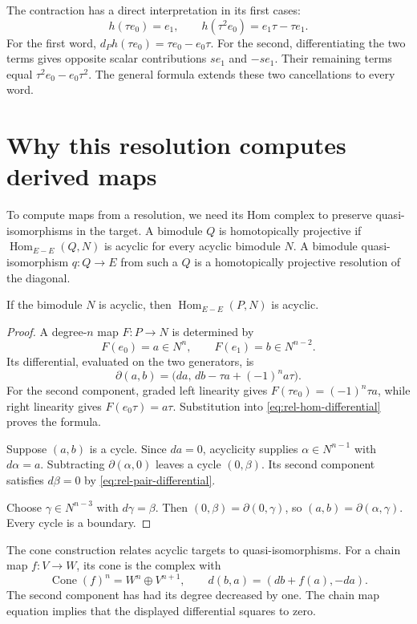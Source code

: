The contraction has a direct interpretation in its first cases:
\[
 h(\tau e_0)=e_1,
 \qquad h(\tau^2e_0)=e_1\tau-\tau e_1.
\]
For the first word, $d_Ph(\tau e_0)=\tau e_0-e_0\tau$.
For the second, differentiating the two terms gives opposite scalar
contributions $s e_1$ and $-s e_1$.
Their remaining terms equal $\tau^2e_0-e_0\tau^2$.
The general formula extends these two cancellations to every word.

\section{Why this resolution computes derived maps}
\label{sec:rel-derived-maps}

To compute maps from a resolution, we need its Hom complex to preserve
quasi-isomorphisms in the target.
A bimodule $Q$ is homotopically projective if
$\operatorname{Hom}_{E-E}(Q,N)$ is acyclic for every acyclic bimodule $N$.
A bimodule quasi-isomorphism $q:Q\to E$ from such a $Q$ is a
homotopically projective resolution of the diagonal.

\begin{lemma}\label{lem:rel-hom-acyclic}
If the bimodule $N$ is acyclic, then
$\operatorname{Hom}_{E-E}(P,N)$ is acyclic.
\end{lemma}

\begin{proof}
A degree-$n$ map $F:P\to N$ is determined by
\[
 F(e_0)=a\in N^n,\qquad F(e_1)=b\in N^{n-2}.
\]
Its differential, evaluated on the two generators, is
\begin{equation}\label{eq:rel-pair-differential}
 \partial(a,b)=\bigl(da,\,db-\tau a+(-1)^n a\tau\bigr).
\end{equation}
For the second component, graded left linearity gives
$F(\tau e_0)=(-1)^n\tau a$, while right linearity gives
$F(e_0\tau)=a\tau$. Substitution into
\eqref{eq:rel-hom-differential} proves the formula.

Suppose $(a,b)$ is a cycle. Since $da=0$, acyclicity supplies
$\alpha\in N^{n-1}$ with $d\alpha=a$.
Subtracting $\partial(\alpha,0)$ leaves a cycle $(0,\beta)$.
Its second component satisfies $d\beta=0$ by
\eqref{eq:rel-pair-differential}.

Choose $\gamma\in N^{n-3}$ with $d\gamma=\beta$.
Then $(0,\beta)=\partial(0,\gamma)$, so
$(a,b)=\partial(\alpha,\gamma)$.
Every cycle is a boundary.
\end{proof}

The cone construction relates acyclic targets to quasi-isomorphisms.
For a chain map $f:V\to W$, its cone is the
complex with
\[
 \operatorname{Cone}(f)^n=W^n\oplus V^{n+1},\qquad
 d(b,a)=(db+f(a),-da).
\]
The second component has had its degree decreased by one.
The chain map equation implies that the displayed differential squares to
zero.


